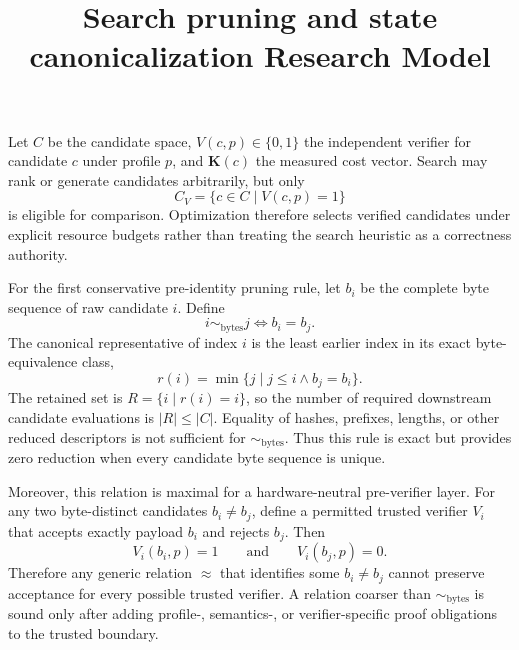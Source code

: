 \documentclass{article}
\title{Search pruning and state canonicalization Research Model}
\begin{document}
\maketitle
Let $C$ be the candidate space, $V(c,p)\in\{0,1\}$ the independent verifier
for candidate $c$ under profile $p$, and $\mathbf{K}(c)$ the measured cost
vector. Search may rank or generate candidates arbitrarily, but only
\[
  C_V = \{c\in C\mid V(c,p)=1\}
\]
is eligible for comparison. Optimization therefore selects verified candidates
under explicit resource budgets rather than treating the search heuristic as a
correctness authority.

For the first conservative pre-identity pruning rule, let $b_i$ be the complete
byte sequence of raw candidate $i$. Define
\[
  i \sim_{\mathrm{bytes}} j \iff b_i=b_j.
\]
The canonical representative of index $i$ is the least earlier index in its exact
byte-equivalence class,
\[
  r(i)=\min\{j\mid j\le i\land b_j=b_i\}.
\]
The retained set is $R=\{i\mid r(i)=i\}$, so the number of required downstream
candidate evaluations is $|R|\le |C|$. Equality of hashes, prefixes, lengths, or
other reduced descriptors is not sufficient for $\sim_{\mathrm{bytes}}$. Thus
this rule is exact but provides zero reduction when every candidate byte sequence
is unique.

Moreover, this relation is maximal for a hardware-neutral pre-verifier layer.
For any two byte-distinct candidates $b_i\ne b_j$, define a permitted trusted
verifier $V_i$ that accepts exactly payload $b_i$ and rejects $b_j$. Then
\[
  V_i(b_i,p)=1 \qquad\text{and}\qquad V_i(b_j,p)=0.
\]
Therefore any generic relation $\approx$ that identifies some
$b_i\ne b_j$ cannot preserve acceptance for every possible trusted verifier.
A relation coarser than $\sim_{\mathrm{bytes}}$ is sound only after adding
profile-, semantics-, or verifier-specific proof obligations to the trusted
boundary.
\end{document}
